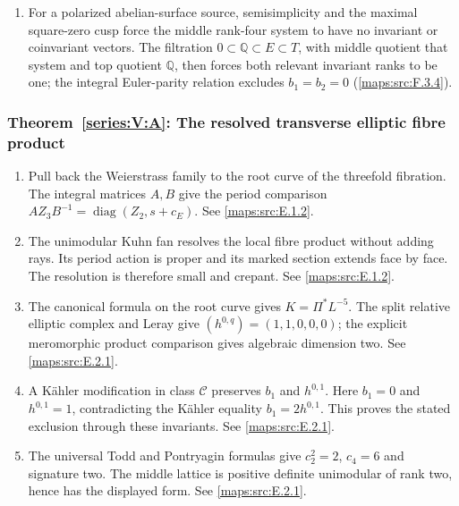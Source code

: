 \begin{enumerate}[label=\arabic*.,leftmargin=*]
\item\hypertarget{step-V-F-6}{} For a polarized abelian-surface source, semisimplicity and the
  maximal square-zero cusp force the middle rank-four system to have
  no invariant or coinvariant vectors.  The filtration
  $0\subset\mathbb Q\subset E\subset T$, with middle quotient that
  system and top quotient $\mathbb Q$, then forces both relevant
  invariant ranks to be one; the integral Euler-parity relation
  excludes $b_1=b_2=0$ (\cref{maps:src:F.3.4}).

\end{enumerate}

\hypertarget{outline-V-A}{}
\subsubsection*{Theorem~\ref{series:V:A}: The resolved transverse elliptic fibre product}
\begin{enumerate}[label=\arabic*.,leftmargin=*]
\item\hypertarget{step-V-A-1}{} Pull back the Weierstrass family to the root curve of the
threefold fibration.  The integral matrices $A,B$ give the period comparison $AZ_3B^{-1}=\operatorname{diag}(Z_2,s+c_E)$.
See \cref{maps:src:E.1.2}.
\item\hypertarget{step-V-A-2}{} The unimodular Kuhn fan resolves the local fibre product
without adding rays.  Its period action is proper and its marked
section extends face by face.  The resolution is therefore small
and crepant.
See \cref{maps:src:E.1.2}.
\item\hypertarget{step-V-A-3}{} The canonical formula on the root curve gives
$K=\Pi^*L^{-5}$.  The split relative elliptic complex and Leray
give $(h^{0,q})=(1,1,0,0,0)$; the explicit meromorphic product
comparison gives algebraic dimension two.
See \cref{maps:src:E.2.1}.
\item\hypertarget{step-V-A-4}{} A K\"ahler modification in class $\mathcal C$ preserves
$b_1$ and $h^{0,1}$.  Here $b_1=0$ and $h^{0,1}=1$, contradicting
the K\"ahler equality $b_1=2h^{0,1}$.  This proves the stated
exclusion through these invariants.
See \cref{maps:src:E.2.1}.
\item\hypertarget{step-V-A-5}{} The universal Todd and Pontryagin formulas give
$c_2^2=2$, $c_4=6$ and signature two.  The middle lattice is
positive definite unimodular of rank two, hence has the displayed
form.  
See \cref{maps:src:E.2.1}.
\end{enumerate}

